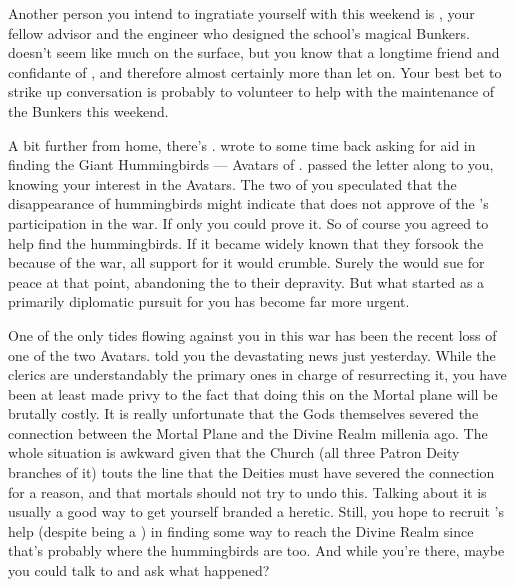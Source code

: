 \documentclass[char]{GL2020}
\begin{document}
Another person you intend to ingratiate yourself with this weekend is \cBunker{\full}, your fellow advisor and the engineer who designed the school's magical Bunkers. \cBunker{} doesn't seem like much on the surface, but you know that \cBunker{\theyare} a longtime friend and confidante of \cHeadDiplomat{}, and therefore almost certainly more than \cBunker{\they} let\cBunker{\verbs} on. Your best bet to strike up conversation is probably to volunteer to help \cBunker{} with the maintenance of the Bunkers this weekend.

A bit further from home, there's \cDisney{\full}. \cDisney{\They} wrote to \cHeadDiplomat{} some time back asking for aid in finding the Giant Hummingbirds — Avatars of \cFarmGod{}. \cHeadDiplomat{} passed the letter along to you, knowing your interest in the Avatars. The two of you speculated that the disappearance of hummingbirds might indicate that \cFarmGod{} does not approve of the \pFarm{}’s participation in the war. If only you could prove it. So of course you agreed to help \cDisney{} find the hummingbirds. If it became widely known that they forsook the \pFarm{} because of the war, all support for it would crumble. Surely the \pFarm{} would sue for peace at that point, abandoning the \pTech{} to their depravity. But what started as a primarily diplomatic pursuit for you has become far more urgent.

One of the only tides flowing against you in this war has been the recent loss of one of the two \pShip{} Avatars. \cEbbPriest{} told you the devastating news just yesterday. While the clerics are understandably the primary ones in charge of resurrecting it, you have been at least made privy to the fact that doing this on the Mortal plane will be brutally costly. It is really unfortunate that the Gods themselves severed the connection between the Mortal Plane and the Divine Realm millenia ago. The whole situation is awkward given that the Church (all three Patron Deity branches of it) touts the line that the Deities must have severed the connection for a reason, and that mortals should not try to undo this. Talking about it is usually a good way to get yourself branded a heretic. Still, you hope to recruit \cDisney{}’s help (despite \cDisney{\them} being a \cDisney{\cleric}) in finding some way to reach the Divine Realm since that’s probably where the hummingbirds are too. And while you’re there, maybe you could talk to \cFarmGod{} and ask what happened?
\end{document}

